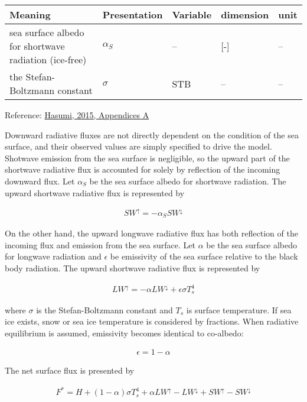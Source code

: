 \setlength\LTleft{0pt}\setlength\LTright{0pt}\begin{longtable}[]{@{}lllll@{}}
\toprule\relax
Meaning & Presentation & Variable & dimension & unit \\
\midrule\relax
\endhead
sea surface albedo for shortwave radiation (ice-free) & \(\alpha_S\) &
-- & {[}-{]} & -- \\
the Stefan-Boltzmann constant & \(\sigma\) & STB & -- & -- \\
\bottomrule
\end{longtable}

Reference:
\href{https://ccsr.aori.u-tokyo.ac.jp/~hasumi/COCO/coco4.pdf}{Hasumi,
2015, Appendices A}

Downward radiative fluxes are not directly dependent on the condition of
the sea surface, and their observed values are simply specified to drive
the model. Shotwave emission from the sea surface is negligible, so the
upward part of the shortwave radiative flux is accounted for solely by
reflection of the incoming downward flux. Let \(\alpha _S\) be the sea
surface albedo for shortwave radiation. The upward shortwave radiative
flux is represented by

\begin{eqnarray}
    SW^\uparrow = - \alpha_S SW^\downarrow
\end{eqnarray}

On the other hand, the upward longwave radiative flux has both
reflection of the incoming flux and emission from the sea surface. Let
\(\alpha\) be the sea surface albedo for longwave radiation and
\(\epsilon\) be emissivity of the sea surface relative to the black body
radiation. The upward shortwave radiative flux is represented by

\begin{eqnarray}
    LW^\uparrow = - \alpha LW^\downarrow + \epsilon \sigma T_s ^4
\end{eqnarray}

where \(\sigma\) is the Stefan-Boltzmann constant and \(T_s\) is surface
temperature. If sea ice exists, snow or sea ice temperature is
considered by fractions. When radiative equilibrium is assumed,
emissivity becomes identical to co-albedo:

\begin{eqnarray}
    \epsilon = 1 - \alpha
\end{eqnarray}

The net surface flux is presented by

\begin{eqnarray}
    F^*=H + (1-\alpha)\sigma T_s^4 + \alpha LW^\uparrow - LW^\downarrow +SW^\uparrow - SW^\downarrow        
\end{eqnarray}

